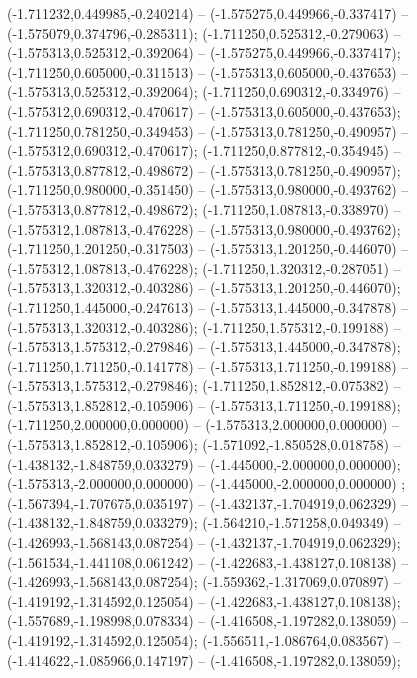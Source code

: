  (-1.711232,0.449985,-0.240214) -- (-1.575275,0.449966,-0.337417) -- (-1.575079,0.374796,-0.285311);
 (-1.711250,0.525312,-0.279063) -- (-1.575313,0.525312,-0.392064) -- (-1.575275,0.449966,-0.337417);
 (-1.711250,0.605000,-0.311513) -- (-1.575313,0.605000,-0.437653) -- (-1.575313,0.525312,-0.392064);
 (-1.711250,0.690312,-0.334976) -- (-1.575312,0.690312,-0.470617) -- (-1.575313,0.605000,-0.437653);
 (-1.711250,0.781250,-0.349453) -- (-1.575313,0.781250,-0.490957) -- (-1.575312,0.690312,-0.470617);
 (-1.711250,0.877812,-0.354945) -- (-1.575313,0.877812,-0.498672) -- (-1.575313,0.781250,-0.490957);
 (-1.711250,0.980000,-0.351450) -- (-1.575313,0.980000,-0.493762) -- (-1.575313,0.877812,-0.498672);
 (-1.711250,1.087813,-0.338970) -- (-1.575312,1.087813,-0.476228) -- (-1.575313,0.980000,-0.493762);
 (-1.711250,1.201250,-0.317503) -- (-1.575313,1.201250,-0.446070) -- (-1.575312,1.087813,-0.476228);
 (-1.711250,1.320312,-0.287051) -- (-1.575313,1.320312,-0.403286) -- (-1.575313,1.201250,-0.446070);
 (-1.711250,1.445000,-0.247613) -- (-1.575313,1.445000,-0.347878) -- (-1.575313,1.320312,-0.403286);
 (-1.711250,1.575312,-0.199188) -- (-1.575313,1.575312,-0.279846) -- (-1.575313,1.445000,-0.347878);
 (-1.711250,1.711250,-0.141778) -- (-1.575313,1.711250,-0.199188) -- (-1.575313,1.575312,-0.279846);
 (-1.711250,1.852812,-0.075382) -- (-1.575313,1.852812,-0.105906) -- (-1.575313,1.711250,-0.199188);
 (-1.711250,2.000000,0.000000) -- (-1.575313,2.000000,0.000000) -- (-1.575313,1.852812,-0.105906);
 (-1.571092,-1.850528,0.018758) -- (-1.438132,-1.848759,0.033279) -- (-1.445000,-2.000000,0.000000);
 (-1.575313,-2.000000,0.000000) -- (-1.445000,-2.000000,0.000000) ;
 (-1.567394,-1.707675,0.035197) -- (-1.432137,-1.704919,0.062329) -- (-1.438132,-1.848759,0.033279);
 (-1.564210,-1.571258,0.049349) -- (-1.426993,-1.568143,0.087254) -- (-1.432137,-1.704919,0.062329);
 (-1.561534,-1.441108,0.061242) -- (-1.422683,-1.438127,0.108138) -- (-1.426993,-1.568143,0.087254);
 (-1.559362,-1.317069,0.070897) -- (-1.419192,-1.314592,0.125054) -- (-1.422683,-1.438127,0.108138);
 (-1.557689,-1.198998,0.078334) -- (-1.416508,-1.197282,0.138059) -- (-1.419192,-1.314592,0.125054);
 (-1.556511,-1.086764,0.083567) -- (-1.414622,-1.085966,0.147197) -- (-1.416508,-1.197282,0.138059);
